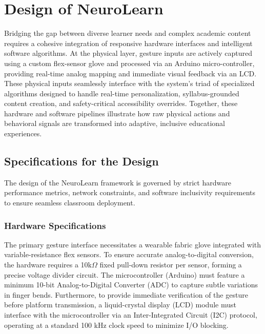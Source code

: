 \chapter{Design of NeuroLearn}

Bridging the gap between diverse learner needs and complex academic content requires a cohesive integration of responsive hardware interfaces and intelligent software algorithms. At the physical layer, gesture inputs are actively captured using a custom flex-sensor glove and processed via an Arduino micro-controller, providing real-time analog mapping and immediate visual feedback via an LCD. These physical inputs seamlessly interface with the system's triad of specialized algorithms designed to handle real-time personalization, syllabus-grounded content creation, and safety-critical accessibility overrides. Together, these hardware and software pipelines illustrate how raw physical actions and behavioral signals are transformed into adaptive, inclusive educational experiences.

\section{Specifications for the Design}
\label{sec:specifications}
The design of the NeuroLearn framework is governed by strict hardware performance metrics, network constraints, and software inclusivity requirements to ensure seamless classroom deployment. 

\subsection{Hardware Specifications}
The primary gesture interface necessitates a wearable fabric glove integrated with variable-resistance flex sensors. To ensure accurate analog-to-digital conversion, the hardware requires a 10k$\Omega$ fixed pull-down resistor per sensor, forming a precise voltage divider circuit. The microcontroller (Arduino) must feature a minimum 10-bit Analog-to-Digital Converter (ADC) to capture subtle variations in finger bends. Furthermore, to provide immediate verification of the gesture before platform transmission, a liquid-crystal display (LCD) module must interface with the microcontroller via an Inter-Integrated Circuit (I2C) protocol, operating at a standard 100 kHz clock speed to minimize I/O blocking.

